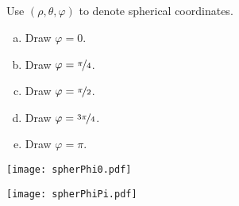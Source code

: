 


\subsection*{\Conceptual}

\begin{question}
Use $(\rho,\theta,\varphi)$ to denote spherical coordinates.
\begin{enumerate}[(a)]
\item
Draw $\varphi=0$.
\item
Draw $\varphi=\nicefrac{\pi}{4}$.
\item 
Draw $\varphi=\nicefrac{\pi}{2}$.
\item
Draw $\varphi=\nicefrac{3\pi}{4}$.
\item
Draw $\varphi=\pi$.
\end{enumerate}

\end{question}

%

\begin{answer}
\begin{center}
   \texttt{[image: spherPhi0.pdf]}\qquad\quad
      \qquad\quad
\end{center}
\begin{center}
\qquad\qquad
   \texttt{[image: spherPhiPi.pdf]}
\end{center}
\end{answer}

